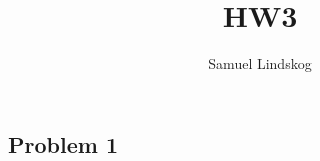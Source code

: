 \documentclass{article}
\begin{document}
\theoremstyle{definition}\newtheorem{definition}{Definition}[section]
\theoremstyle{definition}\newtheorem{theorem}{Theorem}[section]
\theoremstyle{definition}\newtheorem{corrolary}{Corollary}
\theoremstyle{definition}\newtheorem{lemma}{Lemma}[section]
\theoremstyle{definition}\newtheorem{problem}{Problem}
\theoremstyle{remark}\newtheorem*{notation}{Notation}

\title{HW3}
\author{Samuel Lindskog}
\maketitle
\subsection*{Problem 1}
\end{document}
